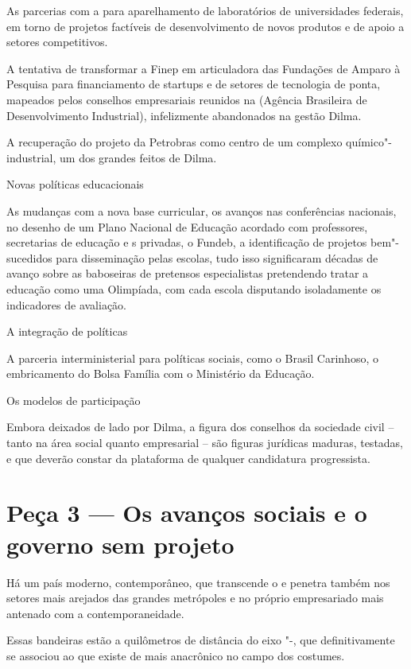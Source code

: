 As parcerias com a  para aparelhamento de laboratórios de
universidades federais, em torno de projetos factíveis de
desenvolvimento de novos produtos e de apoio a setores competitivos.

A tentativa de transformar a Finep em articuladora das Fundações de
Amparo à Pesquisa para financiamento de startups e de setores de
tecnologia de ponta, mapeados pelos conselhos empresariais reunidos na
 (Agência Brasileira de Desenvolvimento Industrial), infelizmente
abandonados na gestão Dilma.

A recuperação do projeto da Petrobras como centro de um complexo
químico"-industrial, um dos grandes feitos de Dilma.

Novas políticas educacionais

As mudanças com a nova base curricular, os avanços nas conferências
nacionais, no desenho de um Plano Nacional de Educação acordado com
professores, secretarias de educação e s privadas, o Fundeb, a
identificação de projetos bem"-sucedidos para disseminação pelas escolas,
tudo isso significaram décadas de avanço sobre as baboseiras de
pretensos especialistas pretendendo tratar a educação como uma
Olimpíada, com cada escola disputando isoladamente os indicadores de
avaliação.

A integração de políticas

A parceria interministerial para políticas sociais, como o Brasil
Carinhoso, o embricamento do Bolsa Família com o Ministério da Educação.

Os modelos de participação

Embora deixados de lado por Dilma, a figura dos conselhos da sociedade
civil -- tanto na área social quanto empresarial -- são figuras
jurídicas maduras, testadas, e que deverão constar da plataforma de
qualquer candidatura progressista.

\section{Peça 3 --- Os avanços sociais e o governo sem projeto}

Há um país moderno, contemporâneo, que transcende o  e penetra também
nos setores mais arejados das grandes metrópoles e no próprio
empresariado mais antenado com a contemporaneidade.

Essas bandeiras estão a quilômetros de distância do eixo "-, que
definitivamente se associou ao que existe de mais anacrônico no campo
dos costumes.

